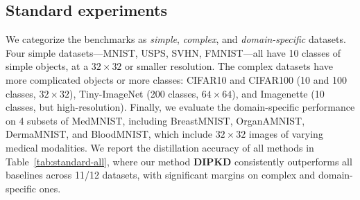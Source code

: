 \documentclass[12pt, a4paper, twoside]{book}
\numberwithin{equation}{chapter}
\theoremstyle{plain}
\theoremstyle{definition}
\theoremstyle{remark}
\newenvironment{foldable}{}{}
\begin{document}
\subsection{Standard experiments} \label{sec:44-research02-experiments-standard}
\begin{foldable} We categorize the benchmarks as \textit{simple}, \textit{complex}, and \textit{domain-specific} datasets.
  Four simple datasets---MNIST, USPS, SVHN, FMNIST---all have 10 classes of simple objects, at a $32\times32$ or smaller resolution.
  The complex datasets have more complicated objects or more classes: CIFAR10 and CIFAR100 (10 and 100 classes, $32\times32$), Tiny-ImageNet (200 classes, $64\times64$), and Imagenette (10 classes, but high-resolution).
  Finally, we evaluate the domain-specific performance on 4 subsets of MedMNIST, including BreastMNIST, OrganAMNIST, DermaMNIST, and BloodMNIST, which include $32\times32$ images of varying medical modalities.
  We report the distillation accuracy of all methods in Table~\ref{tab:standard-all}, where our method \textbf{\ac{DIPKD}} consistently outperforms all baselines across 11/12 datasets, with significant margins on complex and domain-specific ones.
\end{foldable}
\end{document}
